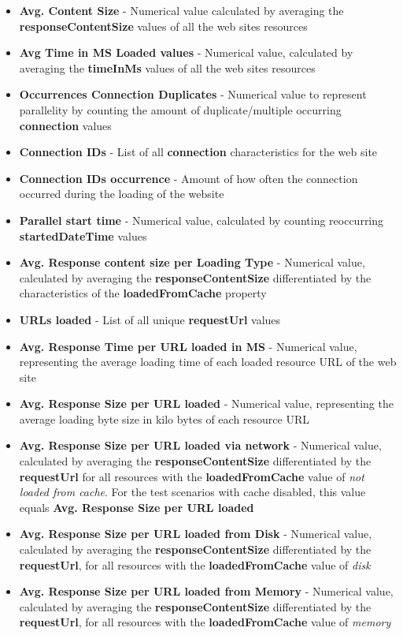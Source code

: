 \begin{itemize}
	\item \textbf{Avg. Content Size} - Numerical value calculated by averaging the \textbf{responseContentSize} values of all the web sites resources
	\item \textbf{Avg Time in MS Loaded values} - Numerical value, calculated by averaging the \textbf{timeInMs} values of all the web sites resources
	\item \textbf{Occurrences Connection Duplicates} - Numerical value to represent parallelity by counting the amount of duplicate/multiple occurring \textbf{connection} values
	\item \textbf{Connection IDs} - List of all \textbf{connection} characteristics for the web site 
	\item \textbf{Connection IDs occurrence} - Amount of how often the connection occurred during the loading of the website
	\item \textbf{Parallel start time} - Numerical value, calculated by counting reoccurring \textbf{startedDateTime} values
	\item \textbf{Avg. Response content size per Loading Type} - Numerical value, calculated by averaging the \textbf{responseContentSize} differentiated by the characteristics of the \textbf{loadedFromCache} property
	\item \textbf{URLs loaded} - List of all unique \textbf{requestUrl} values
	\item \textbf{Avg. Response Time per URL loaded in MS} - Numerical value, representing the average loading time of each loaded resource URL of the web site
	\item \textbf{Avg. Response Size per URL loaded} - Numerical value, representing the average loading byte size in kilo bytes of each resource URL
	\item \textbf{Avg. Response Size per URL loaded via network} - Numerical value, calculated by averaging the \textbf{responseContentSize} differentiated by the \textbf{requestUrl} for all resources with the \textbf{loadedFromCache} value of \textit{not loaded from cache}. For the test scenarios with cache disabled, this value equals \textbf{Avg. Response Size per URL loaded}
	\item \textbf{Avg. Response Size per URL loaded from Disk} - Numerical value, calculated by averaging the \textbf{responseContentSize} differentiated by the \textbf{requestUrl}, for all resources with the \textbf{loadedFromCache} value of \textit{disk}
	\item \textbf{Avg. Response Size per URL loaded from Memory} - Numerical value, calculated by averaging the \textbf{responseContentSize} differentiated by the \textbf{requestUrl}, for all resources with the \textbf{loadedFromCache} value of \textit{memory}
\end{itemize}


